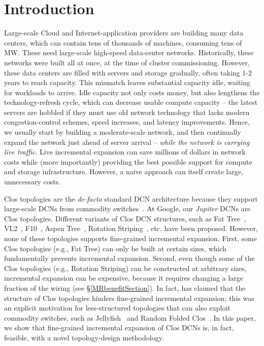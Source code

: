 \documentclass[letterpaper,twocolumn,10pt]{article}
\begin{document}
\maketitle
\section{Introduction}
Large-scale Cloud and Internet-application providers are building many data centers, which can contain tens of thousands of machines, consuming tens of MW.  These need large-scale high-speed data-center networks. Historically, these networks were built all at once, at the time of cluster commissioning. However, these data centers are filled with servers and storage gradually, often taking 1-2 years to reach capacity. This mismatch leaves substantial capacity idle, waiting for workloads to arrive. Idle capacity not only costs money, but also lengthens the technology-refresh cycle, which can decrease usable compute capacity -- the latest servers are hobbled if they must use old network technology that lacks modern congestion-control schemes, speed increases, and latency improvements.
Hence, we usually start by building a moderate-scale network, and then continually expand the network just ahead of server arrival -- \textit{while the network is carrying live traffic}. Live incremental expansion can save millions of dollars in network costs while (more importantly) providing the best possible support for compute and storage infrastructure.
However, a naive approach can itself create large, unnecessary costs. 

Clos topologies are the \emph{de-facto} standard DCN architecture because they support large-scale DCNs from commodity switches~\cite{JupiterRising,CiscoDcn,FacebookDcn,VL2}. 
At Google, our \emph{Jupiter} DCNs are Clos topologies.  Different variants of Clos DCN structures,  such as Fat Tree~\cite{FatTree}, VL2~\cite{VL2}, F10~\cite{F10}, Aspen Tree~\cite{Aspen}, Rotation Striping~\cite{WCMP}, etc. have been proposed. However, none of these topologies supports fine-grained incremental expansion. First, some Clos topologies (e.g., Fat Tree) can only be built at certain sizes, which fundamentally prevents incremental expansion. Second, even though some of the Clos topologies (e.g., Rotation Striping) can be constructed at arbitrary sizes, incremental expansion can be expensive, because it requires changing a large fraction of the wiring (see \S\ref{MRbenefitSection}).  In fact, \cite{Jellyfish} has claimed that the structure of Clos topologies hinders fine-grained incremental expansion; this was an explicit motivation for less-structured topologies that can also exploit commodity switches, such as Jellyfish~\cite{Jellyfish} and Random Folded Clos~\cite{RandomClos}. In this paper, we show that fine-grained incremental expansion of Clos DCNs is, in fact, feasible, with a novel topology-design methodology. 
\end{document}
